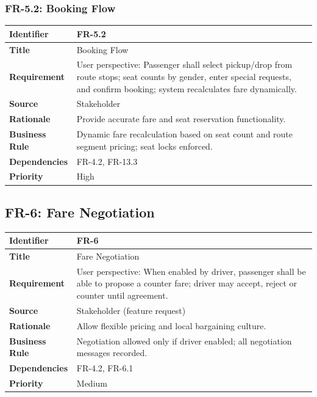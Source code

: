 \subsubsection{FR-5.2: Booking Flow}

\begin{longtable}{|p{3cm}|p{12cm}|}
\hline
\rowcolor{lightgray!30}
\textbf{Identifier} & FR-5.2 \\
\hline
\textbf{Title} & Booking Flow \\
\hline
\textbf{Requirement} & User perspective: Passenger shall select pickup/drop from route stops; seat counts by gender, enter special requests, and confirm booking; system recalculates fare dynamically. \\
\hline
\textbf{Source} & Stakeholder \\
\hline
\textbf{Rationale} & Provide accurate fare and seat reservation functionality. \\
\hline
\textbf{Business Rule} & Dynamic fare recalculation based on seat count and route segment pricing; seat locks enforced. \\
\hline
\textbf{Dependencies} & FR-4.2, FR-13.3 \\
\hline
\textbf{Priority} & High \\
\hline
\end{longtable}

\subsection{FR-6: Fare Negotiation}

\begin{longtable}{|p{3cm}|p{12cm}|}
\hline
\rowcolor{lightgray!30}
\textbf{Identifier} & FR-6 \\
\hline
\textbf{Title} & Fare Negotiation \\
\hline
\textbf{Requirement} & User perspective: When enabled by driver, passenger shall be able to propose a counter fare; driver may accept, reject or counter until agreement. \\
\hline
\textbf{Source} & Stakeholder (feature request) \\
\hline
\textbf{Rationale} & Allow flexible pricing and local bargaining culture. \\
\hline
\textbf{Business Rule} & Negotiation allowed only if driver enabled; all negotiation messages recorded. \\
\hline
\textbf{Dependencies} & FR-4.2, FR-6.1 \\
\hline
\textbf{Priority} & Medium \\
\hline
\end{longtable}

